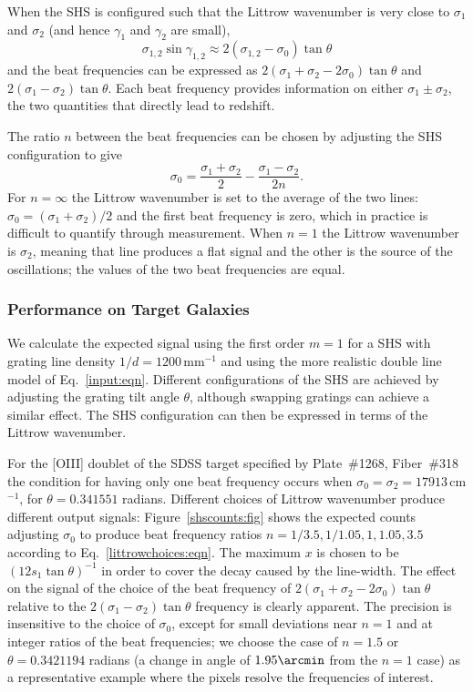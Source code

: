 \documentclass[preprint2, 10pt]{aastex}
\begin{document}
{When the SHS is configured such that the Littrow wavenumber is
very close to $\sigma_1$ and $\sigma_2$ (and hence $\gamma_1$ and $\gamma_2$
are small),
\begin{equation}
\sigma_{1,2}\sin{\gamma_{1,2}} \approx  2(\sigma_{1,2}-\sigma_0) \tan{\theta}
\end{equation}
and the beat frequencies can be expressed as
$2(\sigma_1+\sigma_2-2\sigma_0)\tan{\theta}$ and $2(\sigma_1-\sigma_2)\tan{\theta}$.
Each beat frequency provides information on either 
$\sigma_1\pm \sigma_2$, the two quantities that directly lead to redshift.

The ratio $n$ between the beat frequencies can be chosen by adjusting the SHS configuration to give
\begin{equation}
\sigma_0=\frac{\sigma_1+\sigma_2}{2}-\frac{\sigma_1-\sigma_2}{2n}.
\label{littrowchoices:eqn}
\end{equation}
For $n=\infty$  the Littrow wavenumber is set to the average of the two lines: $\sigma_0=(\sigma_1+\sigma_2)/2$ and the first beat frequency is zero,
which in practice is difficult to quantify through measurement.  When $n=1$ the Littrow wavenumber is $\sigma_2$, meaning that line produces a flat signal and the other is the source
of the oscillations; the values of the two beat frequencies are equal.


\subsubsection{Performance on Target Galaxies}

We calculate the expected signal using the first order $m=1$ for a SHS with grating line density $1/d=1200$\,mm$^{-1}$
and using the more realistic double line model of Eq.~\ref{input:eqn}. 
Different configurations of the SHS are achieved by adjusting the grating tilt angle $\theta$, although swapping
gratings can achieve a similar effect.
The SHS configuration can then be expressed in terms of the Littrow wavenumber.

For the [OIII] doublet of the
SDSS target specified by Plate~\#1268, Fiber~\#318 
the condition for having only one beat frequency occurs when $\sigma_0=\sigma_2=17913$\,cm$^{-1}$, for 
$\theta=0.341551$ radians.
Different choices of Littrow wavenumber
produce different output signals:
Figure~\ref{shscounts:fig} shows the expected counts adjusting $\sigma_0$ to produce beat frequency ratios
$n=1/3.5,1/1.05,1,1.05,3.5$ according to Eq.~\ref{littrowchoices:eqn}.
The maximum $x$ is chosen to be $(12s_1\tan{\theta})^{-1}$ in order to cover the decay caused by the line-width.
The effect on the signal
of the choice of the beat frequency of $2(\sigma_1+\sigma_2-2\sigma_0)\tan{\theta}$ relative to the $2(\sigma_1-\sigma_2)\tan{\theta}$ frequency
is clearly apparent.
The precision is insensitive to the choice of $\sigma_0$, except
for small deviations near $n=1$ and at integer ratios of the beat frequencies; we choose
the case of $n=1.5$ or $\theta = 0.3421194$ radians (a change in angle of $1.95 \arcmin$ from the $n=1$ case)
as a representative example where the pixels resolve the frequencies of interest.

}
\end{document}
